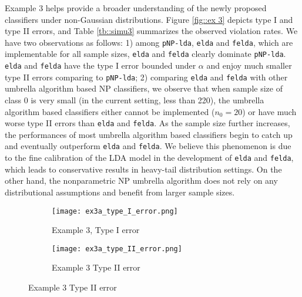 \documentclass[12pt]{article}
\numberwithin{equation}{section}
\theoremstyle{remark}
\newcommand{\1}{{\rm 1}\kern-0.24em{\rm I}}
\begin{document}
\begin{appendices}
Example 3 helps provide a broader understanding of the newly proposed classifiers under non-Gaussian distributions.  Figure \ref{fig::ex 3} depicts type I and type II errors, and Table \ref{tb::simu3} summarizes the observed violation rates.  We have two observations as follows: 1) among \verb+pNP-lda+, \verb+elda+ and \verb+felda+,  which are implementable for all sample sizes,  \verb+elda+ and \verb+felda+ clearly dominate \verb+pNP-lda+.  \verb+elda+ and \verb+felda+ have the type I error bounded under $\alpha$ and enjoy much smaller type II errors comparing to \verb+pNP-lda+;  2) comparing \verb+elda+ and \verb+felda+ with other umbrella algorithm based NP classifiers,  we observe that when sample size of class 0 is very small (in the current setting, less than 220),  the umbrella algorithm based classifiers either cannot be implemented ($n_0=20$) or have much worse type II errors than \verb+elda+ and \verb+felda+.  As the sample size further increases,  the performances of most umbrella algorithm based classifiers begin to catch up and eventually outperform  \verb+elda+ and \verb+felda+.  We believe this phenomenon is due to the fine calibration of the LDA model in the development of \verb+elda+ and \verb+felda+, which leads to conservative results in heavy-tail distribution settings.  On the other hand,  the nonparametric NP umbrella algorithm does not rely on any distributional assumptions and benefit from larger sample sizes.  

\begin{figure}[t]
\caption{Example 3,  type I and type II error for competing methods with increasing and balanced sample sizes \label{fig::ex 3}}

 \begin{subfigure}[t]{0.5\textwidth}
        \centering
        \texttt{[image: ex3a\_type\_I\_error.png]}
        \caption{Example 3, Type I error}
    \end{subfigure}%
      \hspace{+0.1cm}
    \begin{subfigure}[t]{0.5\textwidth}
        \centering
        \texttt{[image: ex3a\_type\_II\_error.png]}
        \caption{Example 3 Type II error}
    \end{subfigure}
    \end{figure}




\end{appendices}
\end{document}
